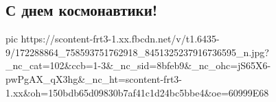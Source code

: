  
 
 
 
 
\subsection{С днем космонавтики!}


\ifcmt
  pic https://scontent-frt3-1.xx.fbcdn.net/v/t1.6435-9/172288864_758593751762918_8451325237916736595_n.jpg?_nc_cat=102&ccb=1-3&_nc_sid=8bfeb9&_nc_ohc=jS65X6-pwPgAX_qX3hg&_nc_ht=scontent-frt3-1.xx&oh=150bdb65d09830b7af41c1d24bc5bbe4&oe=60999E68
\fi

